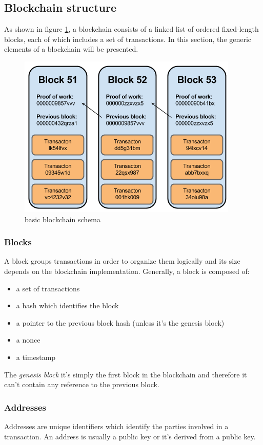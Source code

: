 \subsection{Blockchain structure}
As shown in figure \ref{fig:blockchain-basic-schema}, a blockchain consists of a
linked list of ordered fixed-length blocks, each of which includes a set of transactions.
In this section, the generic elements of a blockchain will be presented.
\begin{figure}[!htb]
	\centering
	\includegraphics[width=0.5\linewidth]{img/blockchain-basic-schema.png}
	\caption{basic blockchain schema}
	\label{fig:blockchain-basic-schema}
\end{figure}

\subsubsection*{Blocks}
A block groups transactions in order to organize them logically and its size
depends on the blockchain implementation. Generally, a block is composed of:
\begin{itemize}
  \item a set of transactions
  \item a hash which identifies the block
  \item a pointer to the previous block hash (unless it's the genesis block)
  \item a nonce
  \item a timestamp
\end{itemize}
The \emph{genesis block} it's simply the first block in the blockchain and therefore
it can't contain any reference to the previous block.


\subsubsection*{Addresses}
Addresses are unique identifiers which identify the parties involved in a
transaction. An address is usually a public key or it's derived from a public key.


